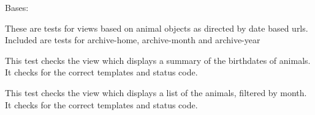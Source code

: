 \documentclass[letterpaper,10pt,english]{sphinxmanual}
\begin{document}

\begin{fulllineitems}
\label{api:mousedb.animal.tests.DateViewTests}
Bases: 

These are tests for views based on animal objects as directed by date based urls.  Included are tests for archive-home, archive-month and archive-year

\begin{fulllineitems}
\label{api:mousedb.animal.tests.DateViewTests.fixtures}
\end{fulllineitems}


\begin{fulllineitems}
\label{api:mousedb.animal.tests.DateViewTests.setUp}
\end{fulllineitems}


\begin{fulllineitems}
\label{api:mousedb.animal.tests.DateViewTests.tearDown}
\end{fulllineitems}


\begin{fulllineitems}
\label{api:mousedb.animal.tests.DateViewTests.test_archive_home}
This test checks the view which displays a summary of the birthdates of animals.  It checks for the correct templates and status code.

\end{fulllineitems}


\begin{fulllineitems}
\label{api:mousedb.animal.tests.DateViewTests.test_archive_month}
This test checks the view which displays a list of the animals, filtered by month.  It checks for the correct templates and status code.


\end{fulllineitems}
\end{fulllineitems}
\end{document}
